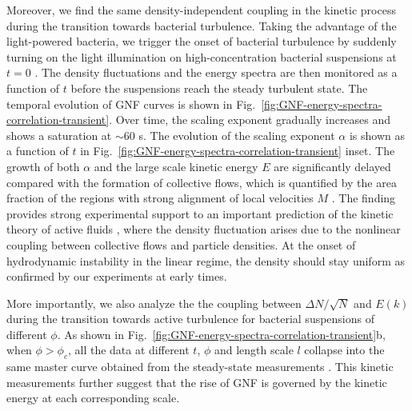 \documentclass[twocolumn,aps,prx,amsmath,amssymb,longbibliography]{revtex4-2}
\begin{document}
Moreover, we find the same density-independent coupling in the kinetic process during the transition towards bacterial turbulence. Taking the advantage of the light-powered bacteria, we trigger the onset of bacterial turbulence by suddenly turning on the light illumination on high-concentration bacterial suspensions at $t=0$ \cite{Peng2020}. The density fluctuations and the energy spectra are then monitored as a function of $t$ before the suspensions reach the steady turbulent state.
The temporal evolution of GNF curves is shown in Fig.~\ref{fig:GNF-energy-spectra-correlation-transient}. Over time, the scaling exponent gradually increases and shows a saturation at $\sim 60$ s.
The evolution of the scaling exponent $\alpha$ is shown as a function of $t$ in Fig.~\ref{fig:GNF-energy-spectra-correlation-transient} inset. The growth of both $\alpha$ and the large scale kinetic energy $E$ are significantly delayed compared with the formation of collective flows, which is quantified by the area fraction of the regions with strong alignment of local velocities $M$ \cite{Liu2020, Peng2020}.
The finding provides strong experimental support to an important prediction of the kinetic theory of active fluids \cite{Saintillan2008a,Saintillan2008b}, where the density fluctuation arises due to the nonlinear coupling between collective flows and particle densities. At the onset of hydrodynamic instability in the linear regime, the density should stay uniform as confirmed by our experiments at early times.

More importantly, we also analyze the the coupling between $\Delta N/\sqrt N$ and $E(k)$ during the transition towards active turbulence for bacterial suspensions of different $\phi$. As shown  in Fig.~\ref{fig:GNF-energy-spectra-correlation-transient}b, when $\phi>\phi_c$, all the data at different $t$, $\phi$ and length scale $l$ collapse into the same master curve obtained from the steady-state measurements \cite{Liu2020}.
This kinetic measurements further suggest that the rise of GNF is governed by the kinetic energy at each corresponding scale.
\end{document}
